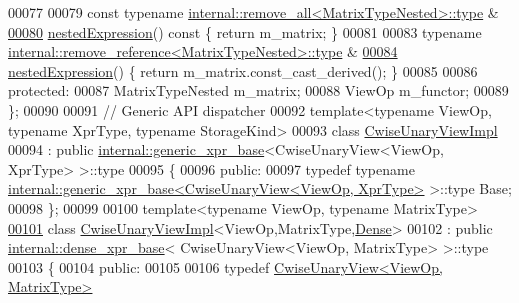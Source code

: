 \begin{DoxyCode}
00077 
00079     \textcolor{keyword}{const} \textcolor{keyword}{typename} \hyperlink{group___sparse_core___module}{internal::remove\_all<MatrixTypeNested>::type}
      &
\hyperlink{group___core___module_a21d59e387e600b1d650cb002175760b4}{00080}     \hyperlink{group___core___module_a21d59e387e600b1d650cb002175760b4}{nestedExpression}()\textcolor{keyword}{ const }\{ \textcolor{keywordflow}{return} m\_matrix; \}
00081 
00083     \textcolor{keyword}{typename} \hyperlink{group___sparse_core___module}{internal::remove\_reference<MatrixTypeNested>::type}
      &
\hyperlink{group___core___module_add6689b53e595e968e89592ea30b6800}{00084}     \hyperlink{group___core___module_add6689b53e595e968e89592ea30b6800}{nestedExpression}() \{ \textcolor{keywordflow}{return} m\_matrix.const\_cast\_derived(); \}
00085 
00086   \textcolor{keyword}{protected}:
00087     MatrixTypeNested m\_matrix;
00088     ViewOp m\_functor;
00089 \};
00090 
00091 \textcolor{comment}{// Generic API dispatcher}
00092 \textcolor{keyword}{template}<\textcolor{keyword}{typename} ViewOp, \textcolor{keyword}{typename} XprType, \textcolor{keyword}{typename} StorageKind>
00093 \textcolor{keyword}{class }\hyperlink{class_eigen_1_1_cwise_unary_view_impl}{CwiseUnaryViewImpl}
00094   : \textcolor{keyword}{public} \hyperlink{struct_eigen_1_1internal_1_1generic__xpr__base}{internal::generic\_xpr\_base}<CwiseUnaryView<ViewOp, XprType> >::type
00095 \{
00096 \textcolor{keyword}{public}:
00097   \textcolor{keyword}{typedef} \textcolor{keyword}{typename} \hyperlink{struct_eigen_1_1internal_1_1generic__xpr__base}{internal::generic\_xpr\_base<CwiseUnaryView<ViewOp, XprType>}
       >::type Base;
00098 \};
00099 
00100 \textcolor{keyword}{template}<\textcolor{keyword}{typename} ViewOp, \textcolor{keyword}{typename} MatrixType>
\hyperlink{class_eigen_1_1_cwise_unary_view_impl_3_01_view_op_00_01_matrix_type_00_01_dense_01_4}{00101} \textcolor{keyword}{class }\hyperlink{class_eigen_1_1_cwise_unary_view_impl}{CwiseUnaryViewImpl}<ViewOp,MatrixType,\hyperlink{struct_eigen_1_1_dense}{Dense}>
00102   : \textcolor{keyword}{public} \hyperlink{struct_eigen_1_1internal_1_1dense__xpr__base}{internal::dense\_xpr\_base}< CwiseUnaryView<ViewOp, MatrixType> >::type
00103 \{
00104   \textcolor{keyword}{public}:
00105 
00106     \textcolor{keyword}{typedef} \hyperlink{group___core___module_class_eigen_1_1_cwise_unary_view}{CwiseUnaryView<ViewOp, MatrixType>} 

\end{DoxyCode}
